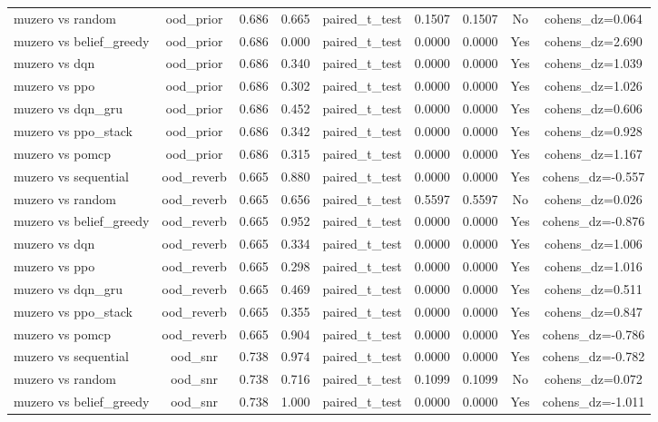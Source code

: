 \begin{table}[htbp]
\begin{tabular}{lcccccccc}
muzero vs random & ood_prior & 0.686 & 0.665 & paired_t_test & 0.1507 & 0.1507 & No & cohens_dz=0.064 \\
muzero vs belief_greedy & ood_prior & 0.686 & 0.000 & paired_t_test & 0.0000 & 0.0000 & Yes & cohens_dz=2.690 \\
muzero vs dqn & ood_prior & 0.686 & 0.340 & paired_t_test & 0.0000 & 0.0000 & Yes & cohens_dz=1.039 \\
muzero vs ppo & ood_prior & 0.686 & 0.302 & paired_t_test & 0.0000 & 0.0000 & Yes & cohens_dz=1.026 \\
muzero vs dqn_gru & ood_prior & 0.686 & 0.452 & paired_t_test & 0.0000 & 0.0000 & Yes & cohens_dz=0.606 \\
muzero vs ppo_stack & ood_prior & 0.686 & 0.342 & paired_t_test & 0.0000 & 0.0000 & Yes & cohens_dz=0.928 \\
muzero vs pomcp & ood_prior & 0.686 & 0.315 & paired_t_test & 0.0000 & 0.0000 & Yes & cohens_dz=1.167 \\
muzero vs sequential & ood_reverb & 0.665 & 0.880 & paired_t_test & 0.0000 & 0.0000 & Yes & cohens_dz=-0.557 \\
muzero vs random & ood_reverb & 0.665 & 0.656 & paired_t_test & 0.5597 & 0.5597 & No & cohens_dz=0.026 \\
muzero vs belief_greedy & ood_reverb & 0.665 & 0.952 & paired_t_test & 0.0000 & 0.0000 & Yes & cohens_dz=-0.876 \\
muzero vs dqn & ood_reverb & 0.665 & 0.334 & paired_t_test & 0.0000 & 0.0000 & Yes & cohens_dz=1.006 \\
muzero vs ppo & ood_reverb & 0.665 & 0.298 & paired_t_test & 0.0000 & 0.0000 & Yes & cohens_dz=1.016 \\
muzero vs dqn_gru & ood_reverb & 0.665 & 0.469 & paired_t_test & 0.0000 & 0.0000 & Yes & cohens_dz=0.511 \\
muzero vs ppo_stack & ood_reverb & 0.665 & 0.355 & paired_t_test & 0.0000 & 0.0000 & Yes & cohens_dz=0.847 \\
muzero vs pomcp & ood_reverb & 0.665 & 0.904 & paired_t_test & 0.0000 & 0.0000 & Yes & cohens_dz=-0.786 \\
muzero vs sequential & ood_snr & 0.738 & 0.974 & paired_t_test & 0.0000 & 0.0000 & Yes & cohens_dz=-0.782 \\
muzero vs random & ood_snr & 0.738 & 0.716 & paired_t_test & 0.1099 & 0.1099 & No & cohens_dz=0.072 \\
muzero vs belief_greedy & ood_snr & 0.738 & 1.000 & paired_t_test & 0.0000 & 0.0000 & Yes & cohens_dz=-1.011 \\

\end{tabular}
\end{table}
